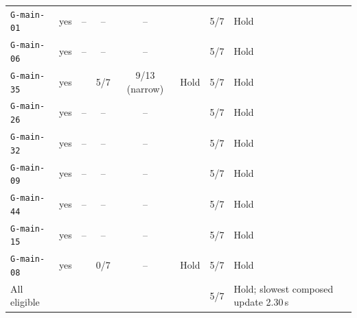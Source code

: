 \begin{table}[pos=t]
\begin{tabularx}{\textwidth}{@{}lccccccY@{}}
\texttt{G-main-01} & yes & -- & -- & -- &  & 5/7 & Hold \\
\texttt{G-main-06} & yes & -- & -- & -- &  & 5/7 & Hold \\
\texttt{G-main-35} & yes & \Pass{} & 5/7 & 9/13 (narrow) & Hold & 5/7 & Hold \\
\texttt{G-main-26} & yes & -- & -- & -- &  & 5/7 & Hold \\
\texttt{G-main-32} & yes & -- & -- & -- &  & 5/7 & Hold \\
\texttt{G-main-09} & yes & -- & -- & -- &  & 5/7 & Hold \\
\texttt{G-main-44} & yes & -- & -- & -- &  & 5/7 & Hold \\
\texttt{G-main-15} & yes & -- & -- & -- &  & 5/7 & Hold \\
\texttt{G-main-08} & yes & \Fail{} & 0/7 & -- & Hold & 5/7 & Hold \\
\midrule
All eligible & & & & & & 5/7 & Hold; slowest composed update 2.30\,s \\
\bottomrule
\end{tabularx}
\end{table}
